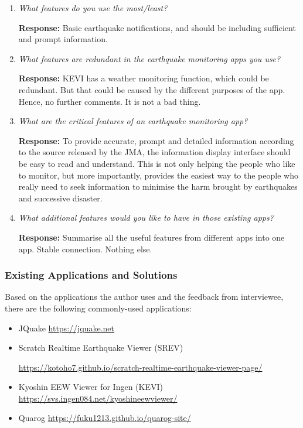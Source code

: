 \documentclass[10pt]{article}
\begin{document}
\begin{enumerate}
    \item \textit{What features do you use the most/least?}

          \textbf{Response:} Basic earthquake notifications, and should be including sufficient and prompt information.

    \item \textit{What features are redundant in the earthquake monitoring apps you use?}

          \textbf{Response:} KEVI has a weather monitoring function, which could be redundant. But that could be caused by the different purposes of the app. Hence, no further comments. It is not a bad thing.

    \item \textit{What are the critical features of an earthquake monitoring app?}

          \textbf{Response:} To provide accurate, prompt and detailed information according to the source released by the JMA, the information display interface should be easy to read and understand. This is not only helping the people who like to monitor, but more importantly, provides the easiest way to the people who really need to seek information to minimise the harm brought by earthquakes and successive disaster.

    \item \textit{What additional features would you like to have in those existing apps?}

          \textbf{Response:} Summarise all the useful features from different apps into one app. Stable connection. Nothing else.


\end{enumerate}

\subsubsection{Existing Applications and Solutions}

Based on the applications the author uses and the feedback from interviewee, there are the following commonly-used applications:
\begin{itemize}
    \item JQuake \url{https://jquake.net}
    \item Scratch Realtime Earthquake Viewer (SREV)

          \url{https://kotoho7.github.io/scratch-realtime-earthquake-viewer-page/}
    \item Kyoshin EEW Viewer for Ingen (KEVI) \url{https://svs.ingen084.net/kyoshineewviewer/}
    \item Quarog \url{https://fuku1213.github.io/quarog-site/}
\end{itemize}
\end{document}
